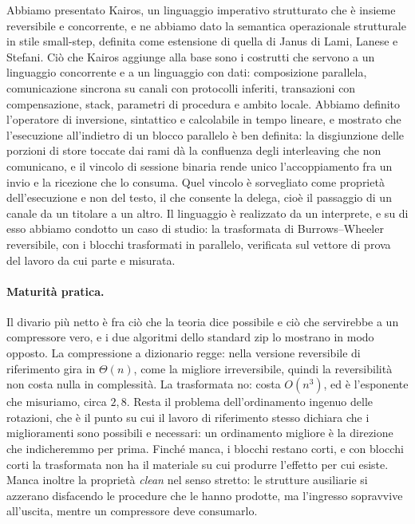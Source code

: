 Abbiamo presentato Kairos, un linguaggio imperativo strutturato che è insieme
reversibile e concorrente, e ne abbiamo dato la semantica operazionale
strutturale in stile small-step, definita come estensione di quella di Janus di
Lami, Lanese e Stefani. Ciò che Kairos aggiunge alla base sono i costrutti che
servono a un linguaggio concorrente e a un linguaggio con dati: composizione
parallela, comunicazione sincrona su canali con protocolli inferiti, transazioni con
compensazione, stack, parametri di procedura e ambito locale. Abbiamo definito
l'operatore di inversione, sintattico e calcolabile in tempo lineare, e mostrato
che l'esecuzione all'indietro di un blocco parallelo è ben definita: la
disgiunzione delle porzioni di store toccate dai rami dà la confluenza degli
interleaving che non comunicano, e il vincolo di sessione binaria rende unico
l'accoppiamento fra un invio e la ricezione che lo consuma. Quel vincolo è
sorvegliato come proprietà dell'esecuzione e non del testo, il che consente la
delega, cioè il passaggio di un canale da un titolare a un altro. Il linguaggio
è realizzato da un interprete, e su di esso abbiamo condotto un caso di studio:
la trasformata di Burrows--Wheeler reversibile, con i blocchi trasformati in
parallelo, verificata sul vettore di prova del lavoro da cui parte e misurata.

\paragraph{Maturità pratica.} Il divario più netto è fra ciò che la teoria dice
possibile e ciò che servirebbe a un compressore vero, e i due algoritmi dello
standard zip lo mostrano in modo opposto. La compressione a dizionario regge:
nella versione reversibile di riferimento gira in $\Theta(n)$, come la migliore
irreversibile, quindi la reversibilità non costa nulla in complessità. La
trasformata no: costa $O(n^3)$, ed è l'esponente che misuriamo, circa $2{,}8$.
Resta il problema dell'ordinamento ingenuo delle rotazioni, che è il punto su cui il
lavoro di riferimento stesso dichiara che i miglioramenti sono possibili e
necessari: un ordinamento migliore è la direzione che indicheremmo per prima.
Finché manca, i blocchi restano corti, e con blocchi corti la trasformata non ha
il materiale su cui produrre l'effetto per cui esiste. Manca inoltre la
proprietà \emph{clean} nel senso stretto: le strutture ausiliarie si azzerano
disfacendo le procedure che le hanno prodotte, ma l'ingresso sopravvive
all'uscita, mentre un compressore deve consumarlo.

